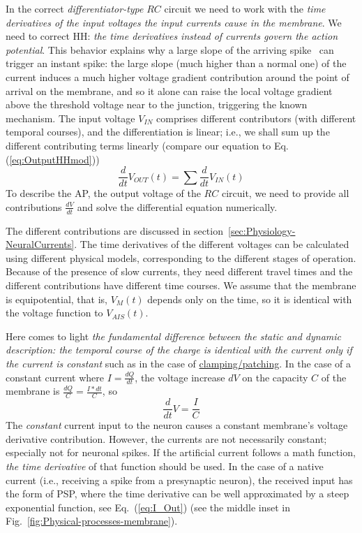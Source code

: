 In the correct \textit{differentiator-type}
$RC$ circuit we
need to work with the \textit{time derivatives of the input voltages the input currents cause in the membrane}.
We need to correct HH: \textit{the time derivatives instead of currents govern the action potential}.
This behavior explains why a large slope of the arriving spike~\cite{LosonczyIntegrative:2006} can trigger an instant spike: the large slope (much higher than a normal one) of the current induces a much higher voltage gradient contribution around the point of arrival on the membrane, and so it alone can raise the local voltage gradient above the threshold voltage near to the junction, triggering the known mechanism.
The input voltage  $V_{IN}$ comprises different contributors (with different temporal courses), and the differentiation
is linear; i.e., we shall sum up the different contributing terms linearly
(compare our equation to Eq.(\ref{eq:OutputHHmod}))
\begin{equation}
	\frac{d}{dt} V_{OUT}(t) = \sum \frac{d}{dt} V_{IN}(t) \label{eq:RC_Parallel_Circuit_Output}
\end{equation}
To describe the 
\gls{AP},
the output voltage of the $RC$ circuit, we need to provide
all contributions $\frac{dV}{dt}$ and solve the differential equation numerically. 

The different contributions are discussed in section~\ref{sec:Physiology-NeuralCurrents}.
The time derivatives of the different voltages
can be calculated using different physical models, corresponding to the different stages of operation.
Because of the presence of slow currents, they need different
travel times and the different contributions have different time courses.
We assume that the membrane is equipotential, that is, $V_M(t)$ depends only on
the time, so it is identical with the voltage function to $V_{AIS}(t)$.

Here comes to light \textit{the fundamental difference between the static and dynamic description: the temporal course of the charge
is identical with the current only if the current is constant} such as in the case of \hyperlink{voltage-clamping}{clamping/patching}.
In the case of a constant current where $I=\frac{dQ}{dt}$, the voltage increase $dV$
on the capacity $C$ of the membrane is $\frac{dQ}{C}=\frac{I*dt}{C}$,
so 
\[\frac{d}{dt} V=\frac{I}{C}\]
The \textit{constant} current input to the neuron causes a constant membrane's voltage derivative contribution.
However, the currents are not necessarily constant;
especially not for neuronal spikes.
If the artificial current follows a math function,
\textit{the time derivative} of that function should be used.
In the case of a native current (i.e., receiving a spike from a presynaptic neuron), the received input has the form of 
\gls{PSP},
where the time derivative can be well approximated by a steep exponential function, see Eq.~(\ref{eq:I_Out}) (see the middle inset in Fig.~\ref{fig:Physical-processes-membrane}).

